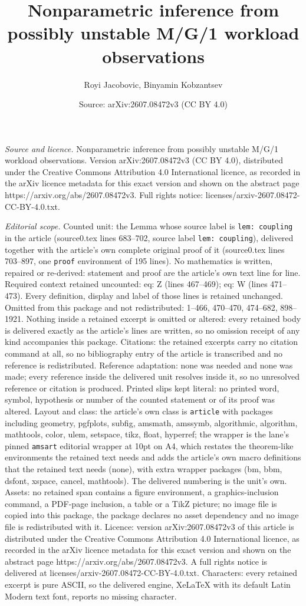 \documentclass[10pt,a4paper]{amsart}
\title[Nonparametric inference from possibly unstable M/G/1 workloa]{Nonparametric inference from possibly unstable M/G/1 workload observations}
\author{Royi Jacobovic, Binyamin Kobzantsev}
\date{Source: arXiv:2607.08472v3 (CC BY 4.0)}
\begin{document}
\maketitle

\noindent\emph{Source and licence.} Nonparametric inference from possibly unstable M/G/1 workload observations. Version arXiv:2607.08472v3 (CC BY 4.0), distributed under the Creative Commons Attribution 4.0 International licence, as recorded in the arXiv licence metadata for this exact version and shown on the abstract page https://arxiv.org/abs/2607.08472v3. Full rights notice: licenses/arxiv-2607.08472-CC-BY-4.0.txt.\par\smallskip

\noindent\textit{Editorial scope.} Counted unit: the Lemma whose source label is \texttt{lem: coupling} in the article (source0.tex lines 683--702, source label \texttt{lem: coupling}), delivered together with the article's own complete original proof of it (source0.tex lines 703--897, one \texttt{proof} environment of 195 lines). No mathematics is written, repaired or re-derived: statement and proof are the article's own text line for line. Required context retained uncounted: eq: Z (lines 467--469); eq: W (lines 471--473). Every definition, display and label of those lines is retained unchanged. Omitted from this package and not redistributed: 1--466, 470--470, 474--682, 898--1921. Nothing inside a retained excerpt is omitted or altered: every retained body is delivered exactly as the article's lines are written, so no omission receipt of any kind accompanies this package. Citations: the retained excerpts carry no citation command at all, so no bibliography entry of the article is transcribed and no reference is redistributed. Reference adaptation: none was needed and none was made; every reference inside the delivered unit resolves inside it, so no unresolved reference or citation is produced. Printed slips kept literal: no printed word, symbol, hypothesis or number of the counted statement or of its proof was altered. Layout and class: the article's own class is \texttt{article} with packages including geometry, pgfplots, subfig, amsmath, amssymb, algorithmic, algorithm, mathtools, color, ulem, setspace, tikz, float, hyperref; the wrapper is the lane's pinned \texttt{amsart} editorial wrapper at 10pt on A4, which restates the theorem-like environments the retained text needs and adds the article's own macro definitions that the retained text needs (none), with extra wrapper packages (bm, bbm, dsfont, xspace, cancel, mathtools). The delivered numbering is the unit's own. Assets: no retained span contains a figure environment, a graphics-inclusion command, a PDF-page inclusion, a table or a TikZ picture; no image file is copied into this package, the package declares no asset dependency and no image file is redistributed with it. Licence: version arXiv:2607.08472v3 of this article is distributed under the Creative Commons Attribution 4.0 International licence, as recorded in the arXiv licence metadata for this exact version and shown on the abstract page https://arxiv.org/abs/2607.08472v3. A full rights notice is delivered at licenses/arxiv-2607.08472-CC-BY-4.0.txt. Characters: every retained excerpt is pure ASCII, so the delivered engine, XeLaTeX with its default Latin Modern text font, reports no missing character.
\end{document}

